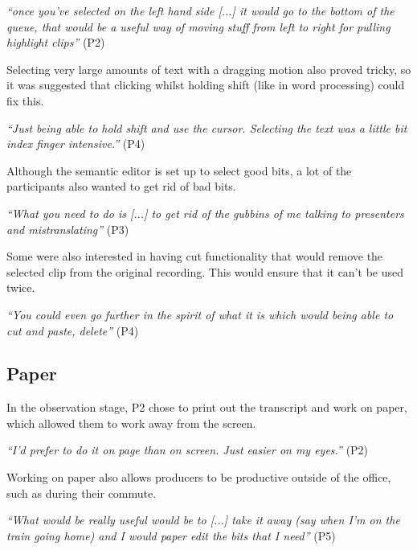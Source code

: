 \textit{``once you've selected on the left hand side [...] it would go to the
  bottom of the queue, that would be a useful way of moving stuff from left to
  right for pulling highlight clips''} (P2)

Selecting very large amounts of text with a dragging motion also proved tricky,
so it was suggested that clicking whilst holding shift (like in word
processing) could fix this.

\textit{``Just being able to hold shift and use the cursor. Selecting the text
  was a little bit index finger intensive.''} (P4)

Although the semantic editor is set up to select good bits, a lot of the
participants also wanted to get rid of bad bits.

\textit{``What you need to do is [...] to get rid of the gubbins of me talking
  to presenters and mistranslating''} (P3)

Some were also interested in having cut functionality that would remove the
selected clip from the original recording. This would ensure that it can't be
used twice.

\textit{``You could even go further in the spirit of what it is which would
  being able to cut and paste, delete''} (P4)



\subsection{Paper}
In the observation stage, P2 chose to print out the transcript and work on
paper, which allowed them to work away from the screen.

\textit{``I'd prefer to do it on page than on screen. Just easier on my
  eyes.''} (P2)

Working on paper also allows producers to be productive outside of the office,
such as during their commute.

\textit{``What would be really useful would be to [...] take it away (say when
  I'm on the train going home) and I would paper edit the bits that I need''}
(P5)

